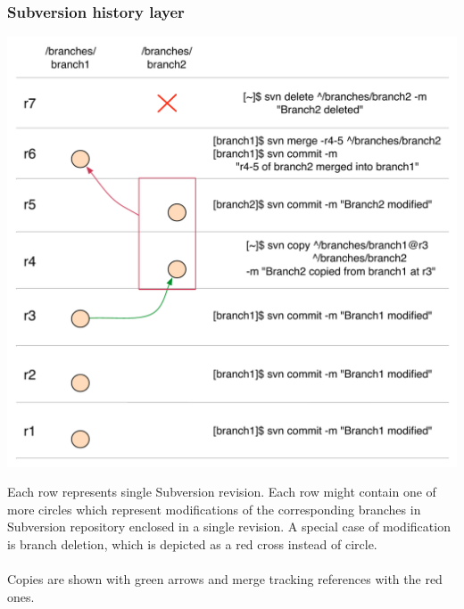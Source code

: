\subsubsection{Subversion history layer}
\begin{center}
\includegraphics[width=\textwidth]{img/legend/svn_layer.pdf}%
\label{svn_layer}%
\end{center}
Each row represents single Subversion revision. Each row might contain one of more circles which represent
modifications of the corresponding branches in Subversion repository enclosed in a single revision. A special %
case of modification is branch deletion, which is depicted as a red cross instead of circle.\\\\
Copies are shown with green arrows and merge tracking references with the red ones.
